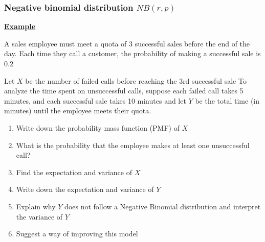 \documentclass[t,8pt]{beamer}%
\begin{document}
    \begin{frame}
		\frametitle{Negative binomial distribution $NB(r,p)$}
		{\bf\underline{Example}} \par
        A sales employee must meet a quota of 3 successful sales before the end of the day. Each time they call a customer, the probability of making a successful sale is 0.2 \par
        Let \( X \) be the number of failed calls before reaching the 3rd successful sale
        To analyze the time spent on unsuccessful calls, suppose each failed call takes 5 minutes, and each successful sale takes 10 minutes and let $Y$ be the total time (in minutes) until the employee meets their quota.
\begin{enumerate}
    \item[(a)] Write down the probability mass function (PMF) of \( X \)
    \item[(b)] What is the probability that the employee makes at least one unsuccessful call?
    \item[(c)] Find the expectation and variance of \( X \)
    \item[(d)] Write down the expectation and variance of \( Y \)
    \item[(e)] Explain why \( Y \) does not follow a Negative Binomial distribution and interpret the variance of $Y$
    \item[(f)] Suggest a way of improving this model
\end{enumerate}
	\end{frame}
\end{document}
